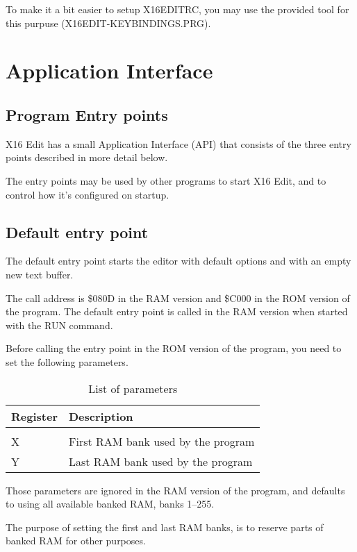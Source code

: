 \documentclass{article}
\begin{document}
To make it a bit easier to setup X16EDITRC, you may use the provided tool for
this purpuse (X16EDIT-KEYBINDINGS.PRG).

\section{Application Interface}

    \subsection{Program Entry points}

        X16 Edit has a small Application Interface (API) that consists of the three
        entry points described in more detail below.

        The entry points may be used by other programs to start X16 Edit, and to
        control how it's configured on startup.

    \subsection{Default entry point}

        The default entry point starts the editor with default options and with an
        empty new text buffer.

        The call address is \$080D in the RAM version and \$C000
        in the ROM version of the program. The default entry point is called in
        the RAM version when started with the RUN command.

        Before calling the entry point in the ROM version of the program, you need to set the following
        parameters.

        \begin{longtable}{l l}
            \caption{List of parameters} \\
	        \textbf{Register} & \textbf{Description} \\
	        \hline \\
            X  & First RAM bank used by the program \\
            Y  & Last RAM bank used by the program \\
        \end{longtable}

        \noindent Those parameters are ignored in the RAM version of the program, and
        defaults to using all available banked RAM, banks 1--255.

        The purpose of setting the first and last RAM banks, is to reserve parts of banked RAM
        for other purposes.
\end{document}
